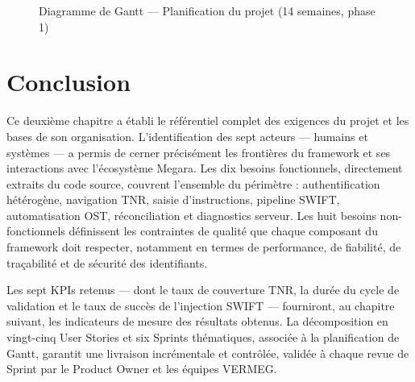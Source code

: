 \documentclass[12pt, a4paper]{report}
\begin{document}
\begin{figure}[H]
{%
}
\caption{Diagramme de Gantt — Planification du projet (14 semaines, phase 1)}
\label{fig:gantt}
\end{figure}

\section*{Conclusion}

Ce deuxième chapitre a établi le référentiel complet des exigences du projet et les bases de son organisation. L'identification des sept acteurs — humains et systèmes — a permis de cerner précisément les frontières du framework et ses interactions avec l'écosystème Megara. Les dix besoins fonctionnels, directement extraits du code source, couvrent l'ensemble du périmètre : authentification hétérogène, navigation TNR, saisie d'instructions, pipeline SWIFT, automatisation OST, réconciliation et diagnostics serveur. Les huit besoins non-fonctionnels définissent les contraintes de qualité que chaque composant du framework doit respecter, notamment en termes de performance, de fiabilité, de traçabilité et de sécurité des identifiants.

Les sept KPIs retenus — dont le taux de couverture TNR, la durée du cycle de validation et le taux de succès de l'injection SWIFT — fourniront, au chapitre suivant, les indicateurs de mesure des résultats obtenus. La décomposition en vingt-cinq User Stories et six Sprints thématiques, associée à la planification de Gantt, garantit une livraison incrémentale et contrôlée, validée à chaque revue de Sprint par le Product Owner et les équipes VERMEG.
\end{document}
